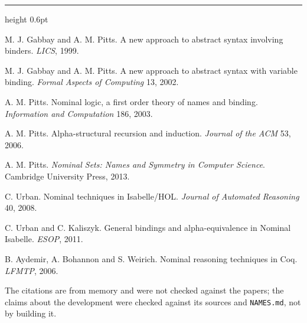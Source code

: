 \documentclass[10pt,a4paper]{article}
\newcommand\code[1]{\texttt{#1}}
\begin{document}
\vspace{0.4em}
{\color{rule}\hrule height 0.6pt}
\vspace{0.3em}
{\footnotesize\color{soft}
\begin{enumerate}[label={[\arabic*]},leftmargin=2em,itemsep=0.05em,topsep=0.2em]
\item M. J. Gabbay and A. M. Pitts. A new approach to abstract syntax involving binders. \emph{LICS}, 1999.
\item M. J. Gabbay and A. M. Pitts. A new approach to abstract syntax with variable binding. \emph{Formal Aspects of Computing} 13, 2002.
\item A. M. Pitts. Nominal logic, a first order theory of names and binding. \emph{Information and Computation} 186, 2003.
\item A. M. Pitts. Alpha-structural recursion and induction. \emph{Journal of the ACM} 53, 2006.
\item A. M. Pitts. \emph{Nominal Sets: Names and Symmetry in Computer Science}. Cambridge University Press, 2013.
\item C. Urban. Nominal techniques in Isabelle/HOL. \emph{Journal of Automated Reasoning} 40, 2008.
\item C. Urban and C. Kaliszyk. General bindings and alpha-equivalence in Nominal Isabelle. \emph{ESOP}, 2011.
\item B. Aydemir, A. Bohannon and S. Weirich. Nominal reasoning techniques in Coq. \emph{LFMTP}, 2006.
\end{enumerate}
The citations are from memory and were not checked against the papers; the
claims about the development were checked against its sources and
\code{NAMES.md}, not by building it.}
\end{document}
